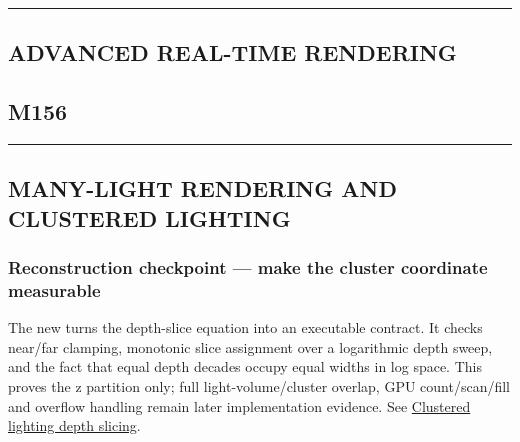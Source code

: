 \begin{center}\rule{0.5\linewidth}{0.5pt}\end{center}

\subsection{ADVANCED REAL-TIME RENDERING}\label{04-visual-computing-ii-ch040-advanced-real-time-rendering}

\hypertarget{04-visual-computing-ii-ch040-advanced-real-time-rendering}{}

\subsection{M156}\label{04-visual-computing-ii-ch040-m156}

\hypertarget{04-visual-computing-ii-ch040-m156}{}

\begin{center}\rule{0.5\linewidth}{0.5pt}\end{center}

\subsection{MANY-LIGHT RENDERING AND CLUSTERED LIGHTING}\label{04-visual-computing-ii-ch040-many-light-rendering-and-clustered-lighting}

\hypertarget{04-visual-computing-ii-ch040-many-light-rendering-and-clustered-lighting}{}

\subsubsection{Reconstruction checkpoint --- make the cluster coordinate measurable}\label{04-visual-computing-ii-ch040-reconstruction-checkpoint-make-the-cluster-coordinate-measurable}

\hypertarget{04-visual-computing-ii-ch040-reconstruction-checkpoint-make-the-cluster-coordinate-measurable}{}

The new  turns the depth-slice equation into an executable contract. It checks near/far clamping, monotonic slice assignment over a logarithmic depth sweep, and the fact that equal depth decades occupy equal widths in log space. This proves the z partition only; full light-volume/cluster overlap, GPU count/scan/fill and overflow handling remain later implementation evidence. See \hyperref[appendix-b0efeb3f3648]{Clustered lighting depth slicing}.

